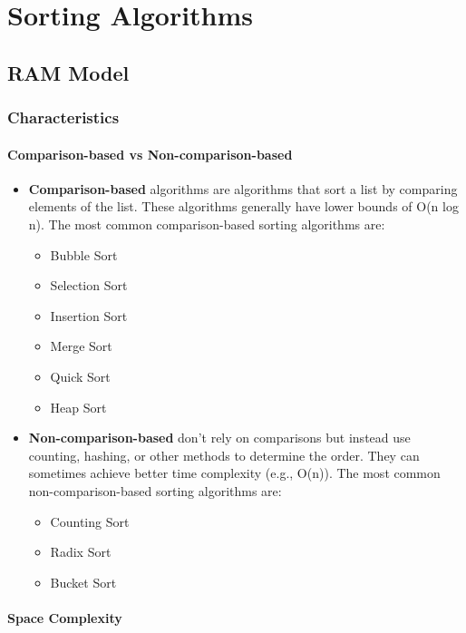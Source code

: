 
\chapter{Sorting Algorithms}

\section{RAM Model}

\subsection{Characteristics}

\subsubsection*{Comparison-based vs Non-comparison-based}

\begin{itemize}
    \item \textbf{Comparison-based} algorithms are algorithms that sort a list by comparing elements of the list. These algorithms generally have lower bounds of O(n log n). The most common comparison-based sorting algorithms are:
    \begin{itemize}
        \item Bubble Sort
        \item Selection Sort
        \item Insertion Sort
        \item Merge Sort
        \item Quick Sort
        \item Heap Sort
    \end{itemize}
    \item \textbf{Non-comparison-based} don’t rely on comparisons but instead use counting, hashing, or other methods to determine the order. They can sometimes achieve better time complexity (e.g., O(n)). The most common non-comparison-based sorting algorithms are:
    \begin{itemize}
        \item Counting Sort
        \item Radix Sort
        \item Bucket Sort
    \end{itemize}
\end{itemize}

\subsubsection*{Space Complexity}

